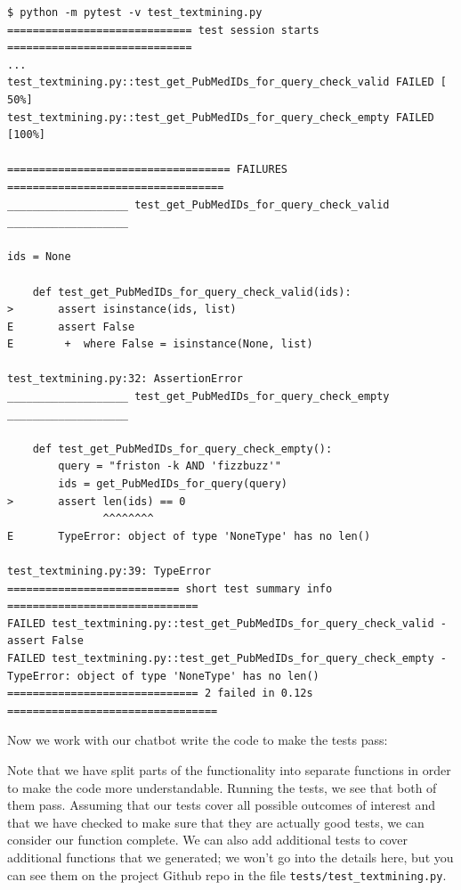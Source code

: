 \begin{lstlisting}[style=shell]
$ python -m pytest -v test_textmining.py
============================= test session starts =============================
...
test_textmining.py::test_get_PubMedIDs_for_query_check_valid FAILED [ 50%]
test_textmining.py::test_get_PubMedIDs_for_query_check_empty FAILED [100%]

=================================== FAILURES ==================================
___________________ test_get_PubMedIDs_for_query_check_valid ___________________

ids = None

    def test_get_PubMedIDs_for_query_check_valid(ids):
>       assert isinstance(ids, list)
E       assert False
E        +  where False = isinstance(None, list)

test_textmining.py:32: AssertionError
___________________ test_get_PubMedIDs_for_query_check_empty ___________________

    def test_get_PubMedIDs_for_query_check_empty():
        query = "friston -k AND 'fizzbuzz'"
        ids = get_PubMedIDs_for_query(query)
>       assert len(ids) == 0
               ^^^^^^^^
E       TypeError: object of type 'NoneType' has no len()

test_textmining.py:39: TypeError
=========================== short test summary info ==============================
FAILED test_textmining.py::test_get_PubMedIDs_for_query_check_valid - assert False
FAILED test_textmining.py::test_get_PubMedIDs_for_query_check_empty - 
TypeError: object of type 'NoneType' has no len()
============================== 2 failed in 0.12s =================================
\end{lstlisting}

Now we work with our chatbot write the code to make the tests pass:



Note that we have split parts of the functionality into separate functions in order to make the code more understandable.
Running the tests, we see that both of them pass.
Assuming that our tests cover all possible outcomes of interest and that we have checked to make sure that they are actually good tests, we can consider our function complete.
We can also add additional tests to cover additional functions that we generated; we won't go into the details here, but you can see them on the project Github repo in the file \texttt{tests/test\_textmining.py}.

